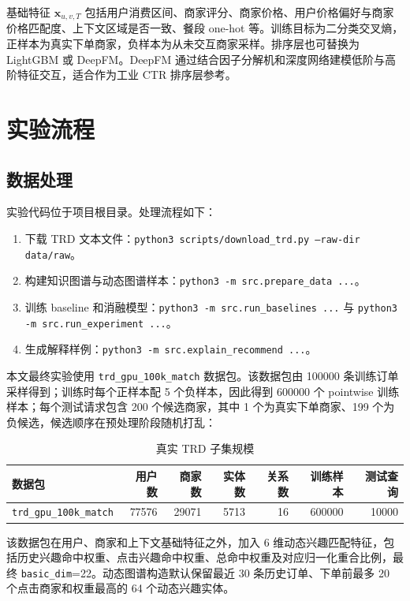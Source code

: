 \documentclass[UTF8,a4paper,12pt]{ctexart}
\begin{document}
基础特征 $\mathbf{x}_{u,v,T}$ 包括用户消费区间、商家评分、商家价格、用户价格偏好与商家价格匹配度、上下文区域是否一致、餐段 one-hot 等。训练目标为二分类交叉熵，正样本为真实下单商家，负样本为从未交互商家采样。排序层也可替换为 LightGBM 或 DeepFM。DeepFM 通过结合因子分解机和深度网络建模低阶与高阶特征交互，适合作为工业 CTR 排序层参考\cite{deepfm}。

\section{实验流程}

\subsection{数据处理}

实验代码位于项目根目录。处理流程如下：

\begin{enumerate}
  \item 下载 TRD 文本文件：\texttt{python3 scripts/download\_trd.py --raw-dir data/raw}。
  \item 构建知识图谱与动态图谱样本：\texttt{python3 -m src.prepare\_data ...}。
  \item 训练 baseline 和消融模型：\texttt{python3 -m src.run\_baselines ...} 与 \texttt{python3 -m src.run\_experiment ...}。
  \item 生成解释样例：\texttt{python3 -m src.explain\_recommend ...}。
\end{enumerate}

本文最终实验使用 \texttt{trd\_gpu\_100k\_match} 数据包。该数据包由 100000 条训练订单采样得到；训练时每个正样本配 5 个负样本，因此得到 600000 个 pointwise 训练样本；每个测试请求包含 200 个候选商家，其中 1 个为真实下单商家、199 个为负候选，候选顺序在预处理阶段随机打乱：

\begin{table}[htbp]
\centering
\caption{真实 TRD 子集规模}
\begin{tabular}{lrrrrrr}
\toprule
数据包 & 用户数 & 商家数 & 实体数 & 关系数 & 训练样本 & 测试查询 \\
\midrule
\texttt{trd\_gpu\_100k\_match} & 77576 & 29071 & 5713 & 16 & 600000 & 10000\\
\bottomrule
\end{tabular}
\end{table}

该数据包在用户、商家和上下文基础特征之外，加入 6 维动态兴趣匹配特征，包括历史兴趣命中权重、点击兴趣命中权重、总命中权重及对应归一化重合比例，最终 \texttt{basic\_dim}=22。动态图谱构造默认保留最近 30 条历史订单、下单前最多 20 个点击商家和权重最高的 64 个动态兴趣实体。
\end{document}
